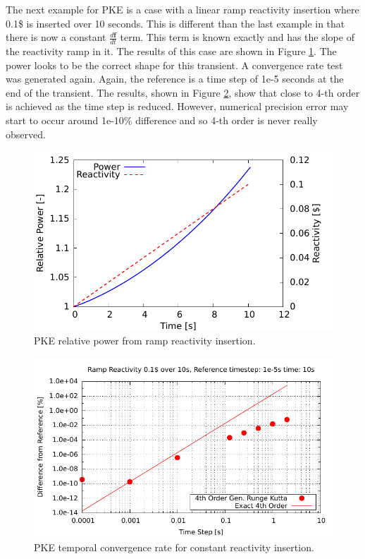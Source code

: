 \documentclass{ansconf}
\numberwithin{equation}{section}
\begin{document}
The next example for PKE is a case with a linear ramp reactivity insertion where 0.1\$ is inserted over 10 seconds. This is different than the last example in that there is now a constant $\frac{d\mathbf{f}}{dt}$ term. This term is known exactly and has the slope of the reactivity ramp in it. The results of this case are shown in Figure \ref{fig:pk_rho_ramp_power}. The power looks to be the correct shape for this transient. A convergence rate test was generated again. Again, the reference is a time step of 1e-5 seconds at the end of the transient.  The results, shown in Figure \ref{fig:pk_rho_ramp_order}, show that close to 4-th order is achieved as the time step is reduced. However, numerical precision error may start to occur around 1e-10\% difference and so 4-th order is never really observed.
\begin{figure} 
\centering \includegraphics[scale=1.00]{./figs/pk_rho_ramp_power.pdf}
\caption{PKE relative power from ramp reactivity insertion.}
\label{fig:pk_rho_ramp_power}
\end{figure}
\begin{figure} 
\centering \includegraphics[scale=1.00]{./figs/pk_rho_ramp_order.pdf}
\caption{PKE temporal convergence rate for constant reactivity insertion.}
\label{fig:pk_rho_ramp_order}
\end{figure}
\end{document}
